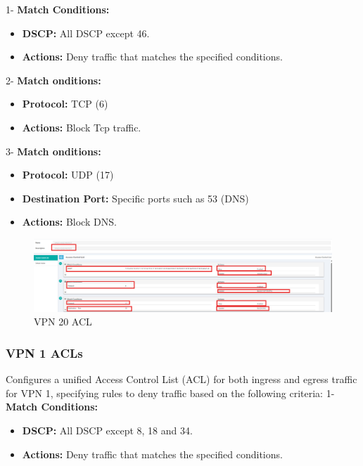 \documentclass[12pt,english]{report}
\begin{document}
1- \textbf{Match Conditions:}
      
\begin{itemize}
    \item \textbf{DSCP:} All DSCP except 46.
    \item \textbf{Actions:} Deny traffic that matches the specified conditions.
\end{itemize}
    
2- \textbf{Match onditions:}
    
\begin{itemize}
    \item \textbf{Protocol:} TCP (6)
    \item \textbf{Actions:} Block Tcp traffic.
\end{itemize}
    
3- \textbf{Match onditions:}

\begin{itemize}
    \item \textbf{Protocol:} UDP (17)
    \item \textbf{Destination Port:} Specific ports such as 53 (DNS)
    \item \textbf{Actions:} Block DNS.
\end{itemize}

\begin{figure}[H]
    \centering
    \includegraphics[width=1.1\textwidth]{chapitre 3/vpn20_acl.png}
    \caption{VPN 20 ACL}
    \label{VPN 20 Unified ACL}
\end{figure}

\subsubsection{VPN 1 ACLs}
Configures a unified Access Control List (ACL) for both ingress and egress traffic for VPN 1, specifying rules to deny traffic based on the following criteria:
1- \textbf{Match Conditions:}
        
\begin{itemize}
    \item \textbf{DSCP:} All DSCP except 8, 18 and 34.
    \item \textbf{Actions:} Deny traffic that matches the specified conditions.
\end{itemize}
    
\end{document}

